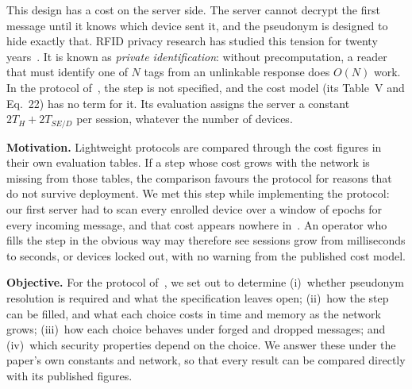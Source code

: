 This design has a cost on the server side. The server cannot decrypt the first message until it knows which device sent
it, and the pseudonym is designed to hide exactly that. RFID privacy research has studied this tension for twenty
years~\cite{weis,ohkubo,molnar,avoine05,ado05,tsudik}. It is known as \emph{private identification}: without
precomputation, a reader that must identify one of $N$ tags from an unlinkable response does $O(N)$ work. In the protocol
of~\cite{base}, the step is not specified, and the cost model (its Table~V and Eq.~22) has no term for it. Its evaluation
assigns the server a constant $2T_H+2T_{SE/D}$ per session, whatever the number of devices.

\textbf{Motivation.} Lightweight protocols are compared through the cost figures in their own evaluation tables. If a
step whose cost grows with the network is missing from those tables, the comparison favours the protocol for reasons that
do not survive deployment. We met this step while implementing the protocol: our first server had to scan every enrolled
device over a window of epochs for every incoming message, and that cost appears nowhere in~\cite{base}. An operator who
fills the step in the obvious way may therefore see sessions grow from milliseconds to seconds, or devices locked out,
with no warning from the published cost model.

\textbf{Objective.} For the protocol of~\cite{base}, we set out to determine (i)~whether pseudonym resolution is required
and what the specification leaves open; (ii)~how the step can be filled, and what each choice costs in time and memory
as the network grows; (iii)~how each choice behaves under forged and dropped messages\iffv; and (iv)~which security
properties depend on the choice\fi. We answer these under the paper's own constants and network, so that every result
can be compared directly with its published figures.

